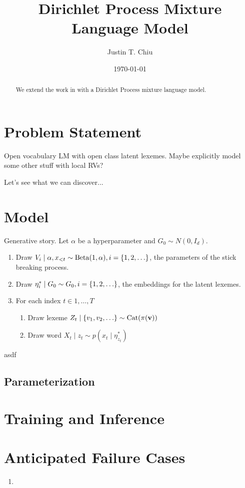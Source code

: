 \documentclass[12pt]{article}
\title{Dirichlet Process Mixture Language Model}
\author{
Justin T. Chiu
}
\date{\today}
\begin{document}
\maketitle

\begin{abstract}
We extend the work in \citet{mielke2018spell}
with a Dirichlet Process mixture language model.
\end{abstract}

\section{Problem Statement}
Open vocabulary LM with open class latent lexemes.
Maybe explicitly model some other stuff with local RVs?

Let's see what we can discover...

\section{Model}

Generative story.
Let $\alpha$ be a hyperparameter and $G_0 \sim N(0, I_d)$.
\begin{enumerate}
\item Draw $V_i \mid \alpha, x_{<t} \sim \mathrm{Beta}(1, \alpha), i = \left\{1,2,\ldots\right\}$,
    the parameters of the stick breaking process.
\item Draw $\eta_i^*\mid G_0 \sim G_0, i = \left\{1,2,\ldots\right\}$,
    the embeddings for the latent lexemes.
\item For each index $t \in 1, \ldots, T$
\begin{enumerate}
\item Draw lexeme $Z_t \mid \left\{v_1,v_2,\ldots\right\} \sim \mathrm{Cat}(\pi(\mathbf{v}))$
\item Draw word $X_t \mid z_t \sim p(x_t \mid \eta^*_{z_t})$
\end{enumerate}
\end{enumerate}
asdf

\subsection{Parameterization}


\section{Training and Inference}


\section{Anticipated Failure Cases}
\begin{enumerate}
\item 
\end{enumerate}



\end{document}
